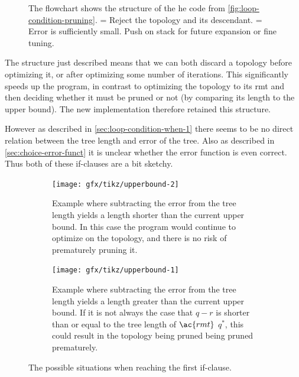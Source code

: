 \begin{figure}[htbp]
  \centering
  
  \caption[Flowchart of loop condition]{The flowchart shows the structure of the
    he code from \cref{fig:loop-condition-pruning}.  = Reject the
    topology and its descendant.  = Error is sufficiently small. Push on
  stack for future expansion or fine tuning.\label{fig:flowchart}}
\end{figure}

The structure just described means that we can both discard a topology before
optimizing it, or after optimizing some number of iterations. This
significantly speeds up the program, in contrast to optimizing the topology to
its \ac{rmt} and then deciding whether it must be pruned or not (by comparing
its length to the upper bound). The new
implementation therefore retained this structure.

However as described in \cref{sec:loop-condition-when-1} there seems to be no
direct relation between the tree length and error of the tree. Also as described in
\cref{sec:choice-error-funct} it is unclear whether the error function is
even correct. Thus both of these if-clauses are a bit sketchy.

\begin{figure}[htbp]
  \centering
  \begin{subfigure}[t]{0.4\textwidth}
    \texttt{[image: gfx/tikz/upperbound-2]}
    \caption{Example where subtracting the error from the tree
      length yields a length shorter than the current upper bound. In this case
      the program would continue to optimize on the topology, and there is no
      risk of prematurely pruning it.\label{fig:upperbound-2}}
  \end{subfigure}\hspace{1em}
  \begin{subfigure}[t]{0.4\textwidth}
    \texttt{[image: gfx/tikz/upperbound-1]}
    \caption{Example where subtracting the error from the tree length yields a
      length greater than the current upper bound. If it is not always the case
      that $q-r$ is shorter than or equal to the tree length of $\ac{rmt}$
      $q^\ast$, this could result in the topology being pruned being pruned
      prematurely.\label{fig:upperbound-1}}
  \end{subfigure}
  \caption[Upper bounds, 1 and 2]{The possible situations when reaching the
    first if-clause.\label{fig:upperbound-1-2}}
\end{figure}


